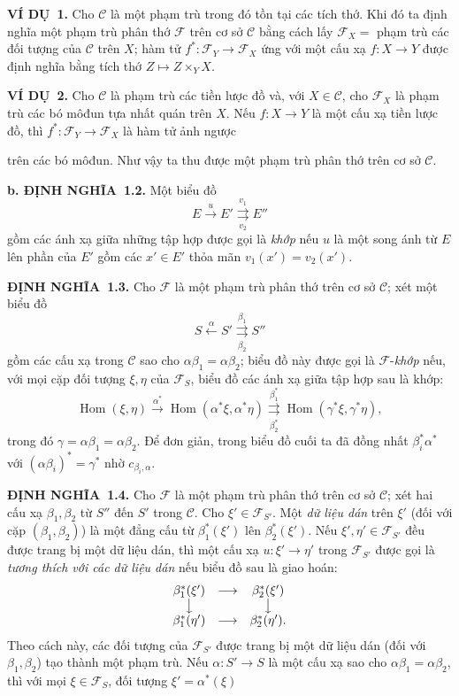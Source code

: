 \documentclass[11pt,twoside,openany]{book}
\numberwithin{equation}{section}
\newcommand{\src}[1]{%
  \phantomsection\hypertarget{src:\fgasourceid:#1}{}%
  \marginpar{\raggedleft\footnotesize\sffamily #1}%
}
\newcommand{\fgasourceid}{unset}
\newcommand{\result}[2]{\par\medskip\noindent\textbf{#1\if\relax\detokenize{#2}\relax\else\ #2\fi.}\quad}
\begin{document}
\result{VÍ DỤ}{1} Cho $\mathcal C$ là một phạm trù trong đó tồn tại các tích
thớ. Khi đó ta định nghĩa một phạm trù phân thớ $\mathcal F$ trên cơ sở
$\mathcal C$ bằng cách lấy $\mathcal F_X=$ phạm trù các đối tượng của
$\mathcal C$ trên $X$; hàm tử
$f^*:\mathcal F_Y\longrightarrow\mathcal F_X$ ứng với một cấu xạ
$f:X\longrightarrow Y$ được định nghĩa bằng tích thớ
$Z\longmapsto Z\times_YX$.

\result{VÍ DỤ}{2} Cho $\mathcal C$ là phạm trù các tiền lược đồ và, với
$X\in\mathcal C$, cho $\mathcal F_X$ là phạm trù các bó môđun tựa nhất quán
trên $X$. Nếu $f:X\longrightarrow Y$ là một cấu xạ tiền lược đồ, thì
$f^*:\mathcal F_Y\longrightarrow\mathcal F_X$ là hàm tử ảnh ngược

\src{301}
trên các bó môđun. Như vậy ta thu được một phạm trù phân thớ trên cơ sở
$\mathcal C$.

\result{b. ĐỊNH NGHĨA}{1.2} Một biểu đồ
\[
  E\xrightarrow{u}E'
  \overset{v_1}{\underset{v_2}{\rightrightarrows}}E''
\]
gồm các ánh xạ giữa những tập hợp được gọi là \emph{khớp} nếu $u$ là một song
ánh từ $E$ lên phần của $E'$ gồm các $x'\in E'$ thỏa mãn
$v_1(x')=v_2(x')$.

\result{ĐỊNH NGHĨA}{1.3} Cho $\mathcal F$ là một phạm trù phân thớ trên cơ sở
$\mathcal C$; xét một biểu đồ
\[
  \tag{+}
  S\xleftarrow{\alpha}S'
  \overset{\beta_1}{\underset{\beta_2}{\rightrightarrows}}S''
\]
gồm các cấu xạ trong $\mathcal C$ sao cho
$\alpha\beta_1=\alpha\beta_2$; biểu đồ này được gọi là
$\mathcal F$-\emph{khớp} nếu, với mọi cặp đối tượng $\xi,\eta$ của
$\mathcal F_S$, biểu đồ các ánh xạ giữa tập hợp sau là khớp:
\[
  \tag{+'}
  \operatorname{Hom}(\xi,\eta)
  \xrightarrow{\alpha^*}
  \operatorname{Hom}(\alpha^*\xi,\alpha^*\eta)
  \overset{\beta_1^*}{\underset{\beta_2^*}{\rightrightarrows}}
  \operatorname{Hom}(\gamma^*\xi,\gamma^*\eta),
\]
trong đó $\gamma=\alpha\beta_1=\alpha\beta_2$. Để đơn giản, trong biểu đồ cuối
ta đã đồng nhất $\beta_i^*\alpha^*$ với
$(\alpha\beta_i)^*=\gamma^*$ nhờ $c_{\beta_i,\alpha}$.

\result{ĐỊNH NGHĨA}{1.4} Cho $\mathcal F$ là một phạm trù phân thớ trên cơ sở
$\mathcal C$; xét hai cấu xạ $\beta_1,\beta_2$ từ $S''$ đến $S'$ trong
$\mathcal C$. Cho $\xi'\in\mathcal F_{S'}$. Một \emph{dữ liệu dán} trên
$\xi'$ (đối với cặp $(\beta_1,\beta_2)$) là một đẳng cấu từ
$\beta_1^*(\xi')$ lên $\beta_2^*(\xi')$. Nếu
$\xi',\eta'\in\mathcal F_{S'}$ đều được trang bị một dữ liệu dán, thì một cấu
xạ $u:\xi'\longrightarrow\eta'$ trong $\mathcal F_{S'}$ được gọi là
\emph{tương thích với các dữ liệu dán} nếu biểu đồ sau là giao hoán:
\[
\begin{array}{ccc}
  \beta_1^*(\xi') & \longrightarrow & \beta_2^*(\xi') \\
  \big\downarrow && \big\downarrow \\
  \beta_1^*(\eta') & \longrightarrow & \beta_2^*(\eta').
\end{array}
\]
Theo cách này, các đối tượng của $\mathcal F_{S'}$ được trang bị một dữ liệu
dán (đối với $\beta_1,\beta_2$) tạo thành một phạm trù. Nếu
$\alpha:S'\longrightarrow S$ là một cấu xạ sao cho
$\alpha\beta_1=\alpha\beta_2$, thì với mọi $\xi\in\mathcal F_S$, đối tượng
$\xi'=\alpha^*(\xi)$
\end{document}
